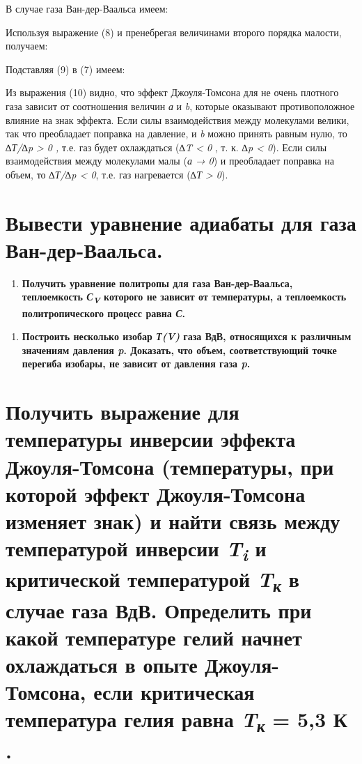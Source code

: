 В случае газа Ван-дер-Ваальса имеем:


Используя выражение (8) и пренебрегая величинами второго порядка
малости, получаем:


Подставляя (9) в (7) имеем:


Из выражения (10) видно, что эффект Джоуля-Томсона для не очень плотного
газа зависит от соотношения величин \emph{а} и \emph{b}, которые
оказывают противоположное влияние на знак эффекта. Если силы
взаимодействия между молекулами велики, так что преобладает поправка на
давление, и \emph{b} можно принять равным нулю, то \emph{∆Т/∆p}
\emph{\textgreater{} 0 ,} т.е. газ будет охлаждаться (\emph{∆T
\textless{} 0} , т. к. \emph{∆p \textless{} 0}). Если силы
взаимодействия между молекулами малы (\emph{а → 0}) и преобладает
поправка на объем, то \emph{∆Т/∆p \textless{} 0}, т.е. газ нагревается
(\emph{∆Т \textgreater{} 0}).

\section{Вывести уравнение адиабаты для газа Ван-дер-Ваальса.}

\begin{enumerate}
\def\labelenumi{\arabic{enumi}.}
\setcounter{enumi}{8}
\item
  \textbf{Получить уравнение политропы для газа Ван-дер-Ваальса,
  теплоемкость \emph{С\textsubscript{V}} которого не зависит от
  температуры, а теплоемкость политропического процесс равна \emph{С}.}
\end{enumerate}

\begin{enumerate}
\def\labelenumi{\arabic{enumi}.}
\setcounter{enumi}{8}
\item
  \textbf{Построить несколько изобар \emph{Т(V)} газа ВдВ, относящихся к
  различным значениям давления \emph{p}. Доказать, что объем,
  соответствующий точке перегиба изобары, не зависит от давления газа
  \emph{p}.}
\end{enumerate}

\section{Получить выражение для температуры инверсии эффекта
Джоуля-Томсона (температуры, при которой эффект Джоуля-Томсона изменяет
знак) и найти связь между температурой инверсии
\emph{T\textsubscript{i}} и критической температурой
\emph{T\textsubscript{к}} в случае газа ВдВ. Определить при какой
температуре гелий начнет охлаждаться в опыте Джоуля-Томсона, если
критическая температура гелия равна \emph{T\textsubscript{к}} = 5,3 К .}